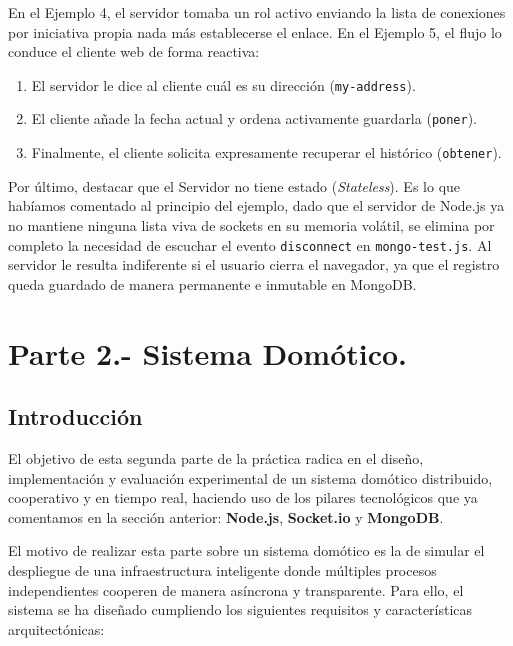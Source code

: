 \documentclass[a4paper,12pt]{article}
\begin{document}
			En el Ejemplo 4, el servidor tomaba un rol activo enviando la lista de conexiones por iniciativa propia nada más establecerse el enlace. En el Ejemplo 5, el flujo lo conduce el cliente web de forma reactiva: 
			\begin{enumerate}
				\item El servidor le dice al cliente cuál es su dirección (\texttt{my-address}).
				\item El cliente añade la fecha actual y ordena activamente guardarla (\texttt{poner}).
				\item Finalmente, el cliente solicita expresamente recuperar el histórico (\texttt{obtener}).
			\end{enumerate}
			
			Por último, destacar que el Servidor no tiene estado (\textit{Stateless}). Es lo que habíamos comentado al principio del ejemplo, dado que el servidor de Node.js ya no mantiene ninguna lista viva de sockets en su memoria volátil, se elimina por completo la necesidad de escuchar el evento \texttt{disconnect} en \texttt{mongo-test.js}. Al servidor le resulta indiferente si el usuario cierra el navegador, ya que el registro queda guardado de manera permanente e inmutable en MongoDB.
	
	\newpage
	\section{Parte 2.- Sistema Domótico.}
		
		\subsection{Introducción}
		
			El objetivo de esta segunda parte de la práctica radica en el diseño, implementación y evaluación experimental de un sistema domótico distribuido, cooperativo y en tiempo real, haciendo uso de los pilares tecnológicos que ya comentamos en la sección anterior:  \textbf{Node.js}, \textbf{Socket.io} y \textbf{MongoDB}. 
			
			El motivo de realizar esta parte sobre un sistema domótico es la de simular el despliegue de una infraestructura inteligente donde múltiples procesos independientes cooperen de manera asíncrona y transparente. Para ello, el sistema se ha diseñado cumpliendo los siguientes requisitos y características arquitectónicas:
		
\end{document}
